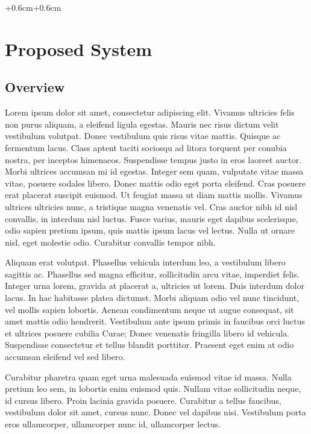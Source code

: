 \documentclass[english]{article}
\begin{document}
\begin{adjustwidth*}{+0.6cm}{+0.6cm}


\section{Proposed System}


\subsection{Overview}

{\large{}Lorem ipsum dolor sit amet, consectetur adipiscing elit.
Vivamus ultricies felis non purus aliquam, a eleifend ligula egestas.
Mauris nec risus dictum velit vestibulum volutpat. Donec vestibulum
quis risus vitae mattis. Quisque ac fermentum lacus. Class aptent
taciti sociosqu ad litora torquent per conubia nostra, per inceptos
himenaeos. Suspendisse tempus justo in eros laoreet auctor. Morbi
ultrices accumsan mi id egestas. Integer sem quam, vulputate vitae
massa vitae, posuere sodales libero. Donec mattis odio eget porta
eleifend. Cras posuere erat placerat suscipit euismod. Ut feugiat
massa ut diam mattis mollis. Vivamus ultrices ultricies nunc, a tristique
magna venenatis vel. Cras auctor nibh id nisl convallis, in interdum
nisl luctus. Fusce varius, mauris eget dapibus scelerisque, odio sapien
pretium ipsum, quis mattis ipsum lacus vel lectus. Nulla ut ornare
nisl, eget molestie odio. Curabitur convallis tempor nibh.}{\large \par}

{\large{}Aliquam erat volutpat. Phasellus vehicula interdum leo, a
vestibulum libero sagittis ac. Phasellus sed magna efficitur, sollicitudin
arcu vitae, imperdiet felis. Integer urna lorem, gravida at placerat
a, ultricies ut lorem. Duis interdum dolor lacus. In hac habitasse
platea dictumst. Morbi aliquam odio vel nunc tincidunt, vel mollis
sapien lobortis. Aenean condimentum neque ut augue consequat, sit
amet mattis odio hendrerit. Vestibulum ante ipsum primis in faucibus
orci luctus et ultrices posuere cubilia Curae; Donec venenatis fringilla
libero id vehicula. Suspendisse consectetur et tellus blandit porttitor.
Praesent eget enim at odio accumsan eleifend vel sed libero.}{\large \par}

{\large{}Curabitur pharetra quam eget urna malesuada euismod vitae
id massa. Nulla pretium leo sem, in lobortis enim euismod quis. Nullam
vitae sollicitudin neque, id cursus libero. Proin lacinia gravida
posuere. Curabitur a tellus faucibus, vestibulum dolor sit amet, cursus
nunc. Donec vel dapibus nisi. Vestibulum porta eros ullamcorper, ullamcorper
nunc id, ullamcorper lectus.}{\large \par}


\end{adjustwidth*}
\end{document}
